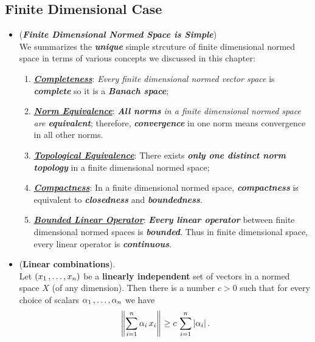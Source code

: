 \documentclass[11pt]{article}
\begin{document}
\subsection{Finite Dimensional Case}
\begin{itemize}
\item \begin{remark} (\emph{\textbf{Finite Dimensional Normed Space is Simple}})\\
We summarizes the \emph{\textbf{unique}} simple strcuture of finite dimensional normed space in terms of various concepts we discussed in this chapter:
\begin{enumerate}
\item \underline{\emph{\textbf{Completeness}}}: \emph{Every finite dimensional normed vector space} is \emph{\textbf{complete}} so it is a \emph{\textbf{Banach space}};

\item \underline{\emph{\textbf{Norm Equivalence}}}: \emph{\textbf{All norms} in a finite dimensional normed space are \textbf{equivalent}}; therefore, \emph{\textbf{convergence}} in one norm means convergence in all other norms.

\item \underline{\emph{\textbf{Topological Equivalence}}}: There exists \emph{\textbf{only one distinct norm topology}} in a finite dimensional normed space; 

\item \underline{\emph{\textbf{Compactness}}}: In a finite dimensional normed space, \emph{\textbf{compactness}} is equivalent to \emph{\textbf{closedness}} and \emph{\textbf{boundedness}}.

\item \underline{\emph{\textbf{Bounded Linear Operator}}}:  \emph{\textbf{Every linear operator}} between  finite dimensional normed spaces  is \emph{\textbf{bounded}}. Thus in finite dimensional space, every linear operator  is \emph{\textbf{continuous}}.
\end{enumerate}
\end{remark}

\item \begin{lemma} (\textbf{Linear combinations}). \citep{kreyszig1989introductory} \\
Let $(x_1 \,{,}\ldots{,}\, x_n)$ be a \textbf{linearly independent} set of vectors in a normed space $X$ (of any dimension).
Then there is a number $c > 0$ such that for every choice of scalars $\alpha_1 \,{,}\ldots{,}\, \alpha_n$ we have
\begin{align}
\left\|\sum_{i=1}^{n}\alpha_i\,x_i\right\|_{} \ge c\,\sum_{i=1}^{n}\left\lvert \alpha_i \right\rvert.\label{eqn: linear_combination_greater_than_coefficient}
\end{align}
\end{lemma}


\end{itemize}
\end{document}

